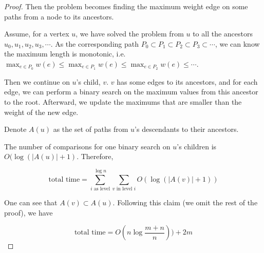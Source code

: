 \begin{proof}
	Then the problem becomes finding the maximum weight edge on some paths from a node to its ancestors.

	Assume, for a vertex $u$, we have solved the problem from $u$ to all the ancestors $u_0, u_1, u_2, u_3, \cdots$. As the corresponding path $P_0 \subset P_1 \subset P_2 \subset P_3 \subset \cdots$, we can know the maximum length is monotonic, i.e. $\max_{e\in P_0} w(e) \le \max_{e\in P_1} w(e) \le \max_{e\in P_2} w(e) \le \cdots$.

	Then we continue on $u$'s child, $v$. $v$ has some edges to its ancestors, and for each edge, we can perform a binary search on the maximum values from this ancestor to the root. Afterward, we update the maximums that are smaller than the weight of the new edge.

	Denote $A(u)$ as the set of paths from $u$'s descendants to their ancestors.

	The number of comparisons for one binary search on $u$'s children is $O(\log(|A(u)|+1)$. Therefore,

	\[
		\text{total time} = \sum_{i \text{ as level}}^{\log n}\sum_{v\text{ in level } i} O(\log(|A(v)|+1)) \]

	One can see that $A(v) \subset A(u)$. Following this claim (we omit the rest of the proof), we have

	\[\text{total time} = O(n\log\frac{m+n}{n})) + 2m \]
\end{proof}



